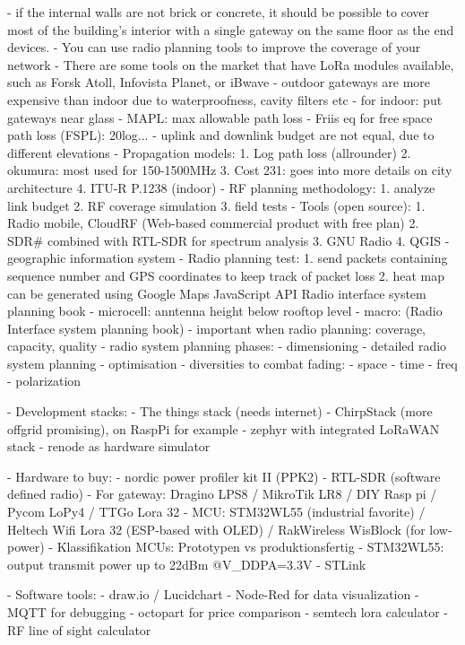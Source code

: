 - if the internal walls are not brick or concrete, it should be possible to cover most of the 
  building’s interior with a single gateway on the same floor as the end devices.
- You can use radio planning tools to improve the coverage of your network
- There are some tools on the market that have LoRa modules available, such as Forsk Atoll, Infovista Planet, or iBwave
- outdoor gateways are more expensive than indoor due to waterproofness, cavity filters etc
- for indoor: put gateways near glass
- MAPL: max allowable path loss
- Friis eq for free space path loss (FSPL): 20log... 
- uplink and downlink budget are not equal, due to different elevations
- Propagation models:
  1. Log path loss (allrounder)
  2. okumura: most used for 150-1500MHz
  3. Cost 231: goes into more details on city architecture
  4. ITU-R P.1238 (indoor)
- RF planning methodology:
  1. analyze link budget 
  2. RF coverage simulation
  3. field tests
- Tools (open source):
  1. Radio mobile, CloudRF (Web-based commercial product with free plan)
  2. SDR# combined with RTL-SDR for spectrum analysis
  3. GNU Radio 
  4. QGIS - geographic information system
- Radio planning test:
  1. send packets containing sequence number and GPS coordinates to keep track of packet loss \cite{petajajarviCoverageLPWANsRange2015}
  2. heat map can be generated using Google Maps JavaScript API %
Radio interface system planning book
- microcell: anntenna height below rooftop level
- macro: (Radio Interface system planning book)
- important when radio planning: coverage, capacity, quality
- radio system planning phases:
  - dimensioning
  - detailed radio system planning 
  - optimisation
- diversities to combat fading:
  - space
  - time 
  - freq
  - polarization 

- Development stacks:
  - The things stack (needs internet)
  - ChirpStack (more offgrid promising), on RaspPi for example
  - zephyr with integrated LoRaWAN stack 
  - renode as hardware simulator
  
- Hardware to buy:
  - nordic power profiler kit II (PPK2)
  - RTL-SDR (software defined radio)
  - For gateway: Dragino LPS8 / MikroTik LR8 / DIY Rasp pi / Pycom LoPy4 / TTGo Lora 32
  - MCU: STM32WL55 (industrial favorite) / Heltech Wifi Lora 32 (ESP-based with OLED) / RakWireless WisBlock (for low-power)
  - Klassifikation MCUs: Prototypen vs produktionsfertig
  - STM32WL55: output transmit power up to 22dBm @V_DDPA=3.3V
  - STLink


- Software tools:
  - draw.io / Lucidchart
  - Node-Red for data visualization
  - MQTT for debugging
  - octopart for price comparison
  - semtech lora calculator
  - RF line of sight calculator

